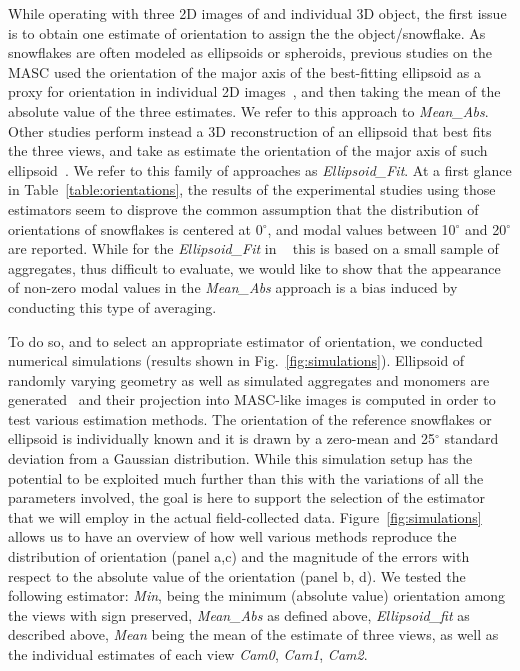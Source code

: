 \documentclass[draft]{agujournal2019}
\begin{document}
While operating with three 2D images of and individual 3D object, the first issue is to obtain one estimate of orientation to assign the the object/snowflake. As snowflakes are often modeled as ellipsoids or spheroids, previous studies on the MASC used the orientation of the major axis of the best-fitting ellipsoid as a proxy for orientation in individual 2D images~\cite{Garrett_GRL_2015,Gergely_JGRA_2016, Fitch_AMT_2021, Fitch_JGR_2022}, and then taking the mean of the absolute value of the three estimates. We refer to this approach to \textit{Mean\_Abs}. Other studies perform instead a 3D reconstruction of an ellipsoid that best fits the three views, and take as estimate the orientation of the major axis of such ellipsoid~\cite{Jiang_JAS_2019}. We refer to this family of approaches as \textit{Ellipsoid\_Fit}. At a first glance in Table~\ref{table:orientations}, the results of the experimental studies using those estimators seem to disprove the common assumption that the distribution of orientations of snowflakes is centered at 0$^\circ$, and modal values between 10$^\circ$ and 20$^\circ$ are reported. While for the \textit{Ellipsoid\_Fit} in ~\cite{Jiang_JAS_2019} this is based on a small sample of aggregates, thus difficult to evaluate, we would like to show that the appearance of non-zero modal values in the \textit{Mean\_Abs} approach is a bias induced by conducting this type of averaging.

To do so, and to select an appropriate estimator of orientation, we conducted numerical simulations (results shown in Fig.~\ref{fig:simulations}). Ellipsoid of randomly varying geometry as well as simulated aggregates and monomers are generated~\cite<as for example in>{Leinonen_AMT_2021} and their projection into MASC-like images is computed in order to test various estimation methods. The orientation of the reference snowflakes or ellipsoid is individually known and it is drawn by a zero-mean and 25$^\circ$ standard deviation from a Gaussian distribution. While this simulation setup has the potential to be exploited much further than this with the variations of all the parameters involved, the goal is here to support the selection of the estimator that we will employ in the actual field-collected data. Figure~\ref{fig:simulations} allows us to have an overview of how well various methods reproduce the distribution of orientation (panel a,c) and the magnitude of the errors with respect to the absolute value of the orientation (panel b, d). We tested the following estimator: \textit{Min}, being the minimum (absolute value) orientation among the views with sign preserved, \textit{Mean\_Abs} as defined above, \textit{Ellipsoid\_fit} as described above, \textit{Mean} being the mean of the estimate of three views, as well as the individual estimates of each view \textit{Cam0}, \textit{Cam1}, \textit{Cam2}. 
\end{document}
